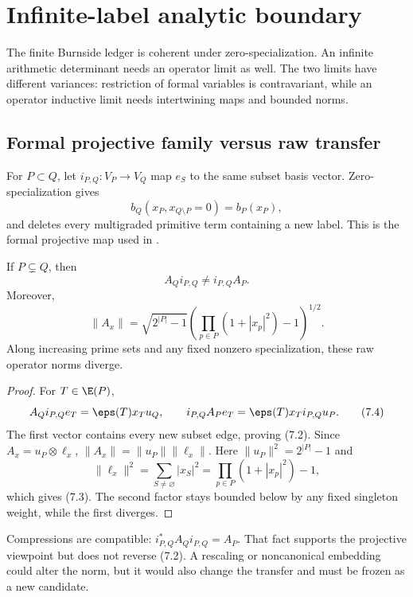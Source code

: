 \section{Infinite-label analytic boundary}
\label{sec:infinite}

The finite Burnside ledger is coherent under zero-specialization.  An
infinite arithmetic determinant needs an operator limit as well.  The two
limits have different variances: restriction of formal variables is
contravariant, while an operator inductive limit needs intertwining maps and
bounded norms.

\subsection{Formal projective family versus raw transfer}

For $P\subset Q$, let $i_{P,Q}:V_P\to V_Q$ map $e_S$ to the same subset
basis vector.  Zero-specialization gives
\[
  b_Q(x_P,x_{Q\setminus P}=0)=b_P(x_P),
  \tag{7.1}
\]
and deletes every multigraded primitive term containing a new label.  This is
the formal projective map used in .

\begin{proposition}
\label{prop:no-inductive-transfer}
If $P\subsetneq Q$, then
\[
  A_Qi_{P,Q}\ne i_{P,Q}A_P.
  \tag{7.2}
\]
Moreover,
\[
  \|A_x\|
  =\sqrt{2^{|P|}-1}
   \left(\prod_{p\in P}(1+|x_p|^2)-1\right)^{1/2}.
  \tag{7.3}
\]
Along increasing prime sets and any fixed nonzero specialization, these raw
operator norms diverge.
\end{proposition}

\begin{proof}
For $T\in\E(P)$,
\[
 A_Qi_{P,Q}e_T=\eps(T)x_Tu_Q,
 \qquad
 i_{P,Q}A_Pe_T=\eps(T)x_Ti_{P,Q}u_P.
 \tag{7.4}
\]
The first vector contains every new subset edge, proving (7.2).  Since
$A_x=u_P\otimes\ell_x$,
$\|A_x\|=\|u_P\|\|\ell_x\|$.  Here
$\|u_P\|^2=2^{|P|}-1$ and
\[
 \|\ell_x\|^2=\sum_{S\ne\varnothing}|x_S|^2
 =\prod_{p\in P}(1+|x_p|^2)-1,
\]
which gives (7.3).  The second factor stays bounded below by any fixed
singleton weight, while the first diverges.
\end{proof}

Compressions are compatible:
$i_{P,Q}^*A_Qi_{P,Q}=A_P$.  That fact supports the projective viewpoint but
does not reverse (7.2).  A rescaling or noncanonical embedding could alter
the norm, but it would also change the transfer and must be frozen as a new
candidate.

